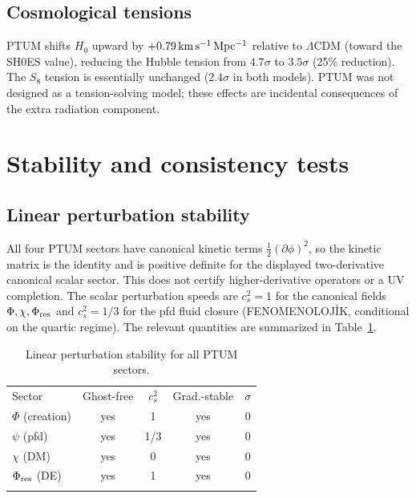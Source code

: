 \documentclass[epj]{svjour}
\begin{document}
\subsection{Cosmological tensions}

PTUM shifts \(H_0\) upward by
\(+0.79\,{\rm km\,s^{-1}\,Mpc^{-1}}\) relative to \(\Lambda\)CDM
(toward the SH0ES value), reducing the Hubble tension from
\(4.7\sigma\) to \(3.5\sigma\) (25\% reduction). The \(S_8\)
tension is essentially unchanged (\(2.4\sigma\) in both models).
PTUM was not designed as a tension-solving model; these effects are
incidental consequences of the extra radiation component.

\section{Stability and consistency tests}
\label{sec:stability}

\subsection{Linear perturbation stability}

All four PTUM sectors have canonical kinetic terms
\(\tfrac12(\partial\phi)^2\), so the kinetic matrix is the identity and
is positive definite for the displayed two-derivative canonical
scalar sector. This does not certify higher-derivative operators or
a UV completion. The scalar perturbation
speeds are \(c_s^2=1\) for the canonical fields \(\Phi,\chi,\Phi_{\rm res}\)
and \(c_s^2=1/3\) for the pfd fluid closure (FENOMENOLOJİK, conditional
on the quartic regime). The relevant quantities are summarized in
Table~\ref{tab:stability}.

\begin{table}
\caption{Linear perturbation stability for all PTUM sectors.}
\label{tab:stability}
\centering
\begin{tabular}{lcccc}
\hline\noalign{\smallskip}
Sector & Ghost-free & \(c_s^2\) & Grad.-stable & \(\sigma\) \\
\noalign{\smallskip}\hline\noalign{\smallskip}
\(\Phi\) (creation)     & yes & 1   & yes & 0 \\
\(\psi\) (pfd)          & yes & 1/3 & yes & 0 \\
\(\chi\) (DM)           & yes & 0   & yes & 0 \\
\(\Phi_{\rm res}\) (DE) & yes & 1   & yes & 0 \\
\noalign{\smallskip}\hline
\end{tabular}
\end{table}
\end{document}
